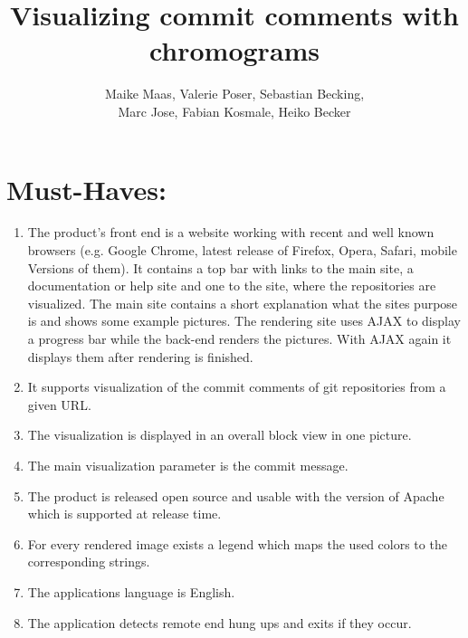 \documentclass[12pt]{scrartcl}
\author{Maike Maas, Valerie Poser, Sebastian Becking,\\
Marc Jose, Fabian Kosmale, Heiko Becker}
\title{Visualizing commit comments with chromograms}
\begin{document}
\maketitle
\section{Must-Haves:}
\begin{enumerate}
\item The product's front end is a website working with recent and well known browsers (e.g. Google Chrome, latest release of Firefox, Opera, Safari, mobile Versions of them). It contains a top bar with links to the main site, a documentation or help site and one to the site, where the repositories are visualized. The main site contains a short explanation what the sites purpose is and shows some example pictures. The rendering site uses AJAX to display a progress bar while the back-end renders the pictures. With AJAX again it displays them after rendering is finished.
\item It supports visualization of the commit comments of git repositories from a given URL. 
\item The visualization is displayed in an overall block view in one picture.
\item The main visualization parameter is the commit message.
\item The product is released open source and usable with the version of Apache which is supported at release time.
\item For every rendered image exists a legend which maps the used colors to the corresponding strings.
\item The applications language is English.
\item The application detects remote end hung ups and exits if they occur.
\end{enumerate}
\end{document}
